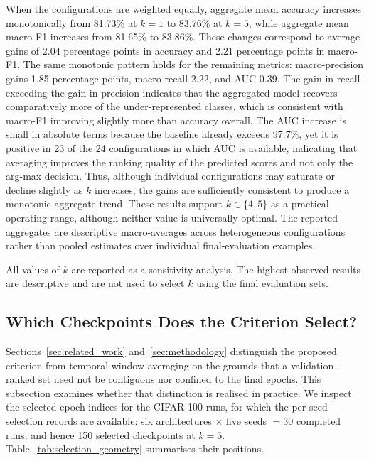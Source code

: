 \documentclass[runningheads]{llncs}
\begin{document}
When the configurations are weighted equally, aggregate mean accuracy
increases monotonically from 81.73\% at $k=1$ to 83.76\% at $k=5$,
while aggregate mean macro-F1 increases from 81.65\% to 83.86\%.
These changes correspond to average gains of 2.04 percentage points
in accuracy and 2.21 percentage points in macro-F1. The same monotonic
pattern holds for the remaining metrics: macro-precision gains 1.85
percentage points, macro-recall 2.22, and AUC 0.39. The gain in recall
exceeding the gain in precision indicates that the aggregated model recovers
comparatively more of the under-represented classes, which is consistent with
macro-F1 improving slightly more than accuracy overall. The AUC increase is
small in absolute terms because the baseline already exceeds 97.7\%, yet it is
positive in 23 of the 24 configurations in which AUC is available, indicating
that averaging improves the ranking quality of the predicted scores and not
only the arg-max decision. Thus, although
individual configurations may saturate or decline slightly as $k$
increases, the gains are sufficiently consistent to produce a monotonic
aggregate trend. These results support $k\in\{4,5\}$ as a practical
operating range, although neither value is universally optimal. The
reported aggregates are descriptive macro-averages across heterogeneous
configurations rather than pooled estimates over individual
final-evaluation examples.

All values of $k$ are reported as a sensitivity analysis. The highest
observed results are descriptive and are not used to select $k$ using
the final evaluation sets.

\FloatBarrier
\subsection{Which Checkpoints Does the Criterion Select?}
\label{sec:selection_geometry}

Sections~\ref{sec:related_work} and~\ref{sec:methodology} distinguish the
proposed criterion from temporal-window averaging on the grounds that a
validation-ranked set need not be contiguous nor confined to the final epochs.
This subsection examines whether that distinction is realised in practice. We
inspect the selected epoch indices for the CIFAR-100 runs, for which the
per-seed selection records are available: six architectures $\times$ five
seeds $=30$ completed runs, and hence 150 selected checkpoints at $k=5$.
Table~\ref{tab:selection_geometry} summarises their positions.
\end{document}
